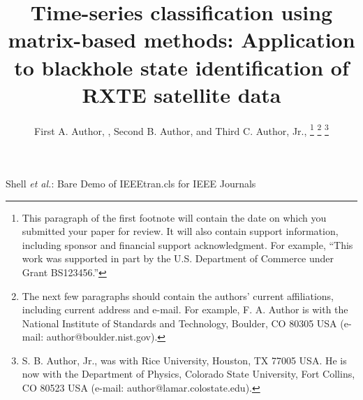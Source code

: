 \documentclass[journal]{IEEEtran}
\begin{document}
\title{ Time-series classification using matrix-based methods: Application to blackhole state identification of RXTE satellite data}

\author{First A. Author, , Second B. Author, and Third C. Author, Jr., 
\thanks{This paragraph of the first footnote will contain the date on which you submitted your paper for review. It will also contain support information, including sponsor and financial support acknowledgment. For example, ``This work was supported in part by the U.S. Department of Commerce under Grant BS123456.'' }
\thanks{The next few paragraphs should contain the authors' current affiliations, including current address and e-mail. For example, F. A. Author is with the National Institute of Standards and Technology, Boulder, CO 80305 USA (e-mail: author@boulder.nist.gov).}
\thanks{S. B. Author, Jr., was with Rice University, Houston, TX 77005 USA. He is now with the Department of Physics, Colorado State University, Fort Collins, CO 80523 USA (e-mail: author@lamar.colostate.edu).}}

{Shell \MakeLowercase{\textit{et al.}}: Bare Demo of IEEEtran.cls for IEEE Journals}
\maketitle
\end{document}
